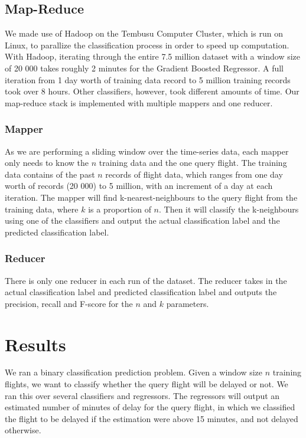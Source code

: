 \documentclass[letterpaper,11pt]{article}
\begin{document}
\subsection{Map-Reduce} 
We made use of Hadoop on the Tembusu Computer Cluster, which is run on Linux, to parallize the classification process in order to speed up computation. With Hadoop, iterating through the entire 7.5 million dataset with a window size of 20 000 takes roughly 2 minutes for the Gradient Boosted Regressor. A full iteration from 1 day worth of training data record to 5 million training records took over 8 hours. Other classifiers, however, took different amounts of time. Our map-reduce stack is implemented with multiple mappers and one reducer. 
\subsubsection{Mapper}
As we are performing a sliding window over the time-series data, each mapper only needs to know the $n$ training data and the one query flight. The training data contains of the past $n$ records of flight data, which ranges from one day worth of records (20 000) to 5 million, with an increment of a day at each iteration. The mapper will find k-nearest-neighbours to the query flight from the training data, where $k$ is a proportion of $n$. Then it will classify the k-neighbours using one of the classifiers and output the actual classification label and the predicted classification label. 

\subsubsection{Reducer}
There is only one reducer in each run of the dataset. The reducer takes in the actual classification label and predicted classification label and outputs the precision, recall and F-score for the $n$ and $k$ parameters. 

\section{Results}
We ran a binary classification prediction problem. Given a window size $n$ training flights, we want to classify whether the query flight will be delayed or not. We ran this over several classifiers and regressors. The regressors will output an estimated number of minutes of delay for the query flight, in which we classified the flight to be delayed if the estimation were above 15 minutes, and not delayed otherwise. 
\end{document}
